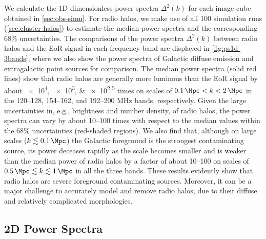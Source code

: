 \documentclass[twocolumn]{aastex62}
\begin{document}
We calculate the 1D dimensionless power spectra $\Delta^2(k)$ for each
image cube obtained in \autoref{sec:obs-simu}.
For radio halos, we make use of all 100 simulation runs
(\autoref{sec:cluster-halos}) to estimate the median power spectra and
the corresponding 68\% uncertainties.
The comparisons of the power spectra $\Delta^2(k)$ between radio halos
and the EoR signal in each frequency band are displayed
in \autoref{fig:ps1d-3bands}, where we also show the power spectra of
Galactic diffuse emission and extragalactic point sources for comparison.
The median power spectra (solid red lines) show that radio halos are
generally more luminous than the EoR signal by about \numlist{e4; e3; e2.5}
times on scales of $\SI{0.1}{\per\Mpc} < k < \SI{2}{\per\Mpc}$ in the
\numrange{120}{128}, \numrange{154}{162}, and \numrange{192}{200} \si{\MHz}
bands, respectively.
Given the large uncertainties in, e.g., brightness and number density,
of radio halos, the power spectra can vary by about \numrange{10}{100}
times with respect to the median values within the 68\%
uncertainties (red-shaded regions).
We also find that, although on large scales
($k \lesssim \SI{0.1}{\per\Mpc}$) the Galactic foreground is the
strongest contaminating source, its power deceases rapidly as the
scale becomes smaller and is weaker than the median power of radio halos
by a factor of about \numrange{10}{100} on scales of
$\SI{0.5}{\per\Mpc} \lesssim k \lesssim \SI{1}{\per\Mpc}$
in all the three bands.
These results evidently show that radio halos are severe foreground
contaminating sources.
Moreover, it can be a major challenge to accurately model and remove radio
halos, due to their diffuse and relatively complicated morphologies.


\subsection{2D Power Spectra}
\label{sec:ps2d}
\end{document}
